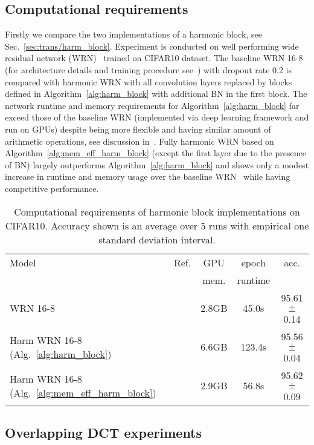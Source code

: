 \documentclass[conference]{IEEEtran}
\begin{document}
\subsection{Computational requirements} 
\label{sec:exp/req}
Firstly we compare the two implementations of a harmonic block, see Sec.~\ref{sec:trans/harm_block}. Experiment is conducted on well performing wide residual network (WRN)~\cite{Zagoruyko16} trained on CIFAR10 dataset. The baseline WRN 16-8 (for architecture details and training procedure see~\cite{Zagoruyko16}) with dropout rate 0.2 is compared with harmonic WRN with all convolution layers replaced by blocks defined in Algorithm~\ref{alg:harm_block} with additional BN in the first block. 
The network runtime and memory requirements for Algorithm~\ref{alg:harm_block} far exceed those of the baseline WRN (implemented via deep learning framework and run on GPUs)
despite being more flexible and having similar amount of arithmetic operations, see discussion in~\cite{Ulicny18}. Fully harmonic WRN based on Algorithm~\ref{alg:mem_eff_harm_block} (except the first layer due to the presence of BN) largely outperforms Algorithm~\ref{alg:harm_block} and shows only a modest increase in runtime and memory usage over the baseline WRN~\cite{Zagoruyko16} while having competitive performance.

\begin{table}[!t]
\centering
\caption{Computational requirements of harmonic block implementations on CIFAR10. Accuracy shown is an average over 5 runs with empirical one standard deviation interval.} \label{tab:alg_req}
 \begin{tabular}{|l|c|ccc|}
  \hline
  Model & Ref. & GPU  & epoch  & acc. \\
 &&  mem. & runtime &  \\
  \hline
  WRN 16-8 &~\cite{Zagoruyko16} & 2.8GB & 45.0s & 95.61$\pm$0.14 \\
  Harm WRN 16-8 (Alg.~\ref{alg:harm_block}) &~\cite{Ulicny18} & 6.6GB & 123.4s & 95.56$\pm$0.04 \\
  Harm WRN 16-8 (Alg.~\ref{alg:mem_eff_harm_block}) &  & 2.9GB & 56.8s & 95.62$\pm$0.09 \\
  \hline
 \end{tabular}
\end{table}

\subsection{Overlapping DCT experiments} \label{sec:exp/overlap}
\end{document}
